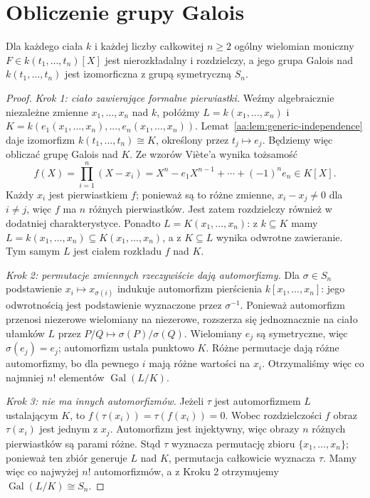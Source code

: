 \section{Obliczenie grupy Galois}
\begin{twierdzenie}
\label{aa:tw:generic-sn}
Dla każdego ciała $k$ i każdej liczby całkowitej $n\ge2$ ogólny
wielomian moniczny $F\in k(t_1,\ldots,t_n)[X]$ jest nierozkładalny
i rozdzielczy, a jego grupa Galois nad $k(t_1,\ldots,t_n)$
jest izomorficzna z grupą symetryczną $S_n$.
\end{twierdzenie}
\begin{proof}
\emph{Krok 1: ciało zawierające formalne pierwiastki.}
Weźmy algebraicznie niezależne zmienne $x_1,\ldots,x_n$ nad $k$,
połóżmy $L=k(x_1,\ldots,x_n)$ i
$K=k(e_1(x_1,\ldots,x_n),\ldots,e_n(x_1,\ldots,x_n))$.
Lemat~\ref{aa:lem:generic-independence} daje izomorfizm
$k(t_1,\ldots,t_n)\cong K$, określony przez $t_j\mapsto e_j$.
Będziemy więc obliczać grupę Galois nad $K$.
Ze wzorów Viète'a wynika tożsamość
\[
 f(X)=\prod_{i=1}^n(X-x_i)
 =X^n-e_1X^{n-1}+\cdots+(-1)^ne_n\in K[X].
\]
Każdy $x_i$ jest pierwiastkiem $f$; ponieważ są to różne zmienne,
$x_i-x_j\ne0$ dla $i\ne j$, więc $f$ ma $n$ różnych pierwiastków.
Jest zatem rozdzielczy również w dodatniej charakterystyce.
Ponadto $L=K(x_1,\ldots,x_n)$: z $k\subseteq K$ mamy
$L=k(x_1,\ldots,x_n)\subseteq K(x_1,\ldots,x_n)$,
a z $K\subseteq L$ wynika odwrotne zawieranie.
Tym samym $L$ jest ciałem rozkładu $f$ nad $K$.

\emph{Krok 2: permutacje zmiennych rzeczywiście dają automorfizmy.}
Dla $\sigma\in S_n$ podstawienie $x_i\mapsto x_{\sigma(i)}$
indukuje automorfizm pierścienia $k[x_1,\ldots,x_n]$:
jego odwrotnością jest podstawienie wyznaczone przez $\sigma^{-1}$.
Ponieważ automorfizm przenosi niezerowe wielomiany na niezerowe,
rozszerza się jednoznacznie na ciało ułamków $L$ przez
$P/Q\mapsto\sigma(P)/\sigma(Q)$.
Wielomiany $e_j$ są symetryczne, więc $\sigma(e_j)=e_j$;
automorfizm ustala punktowo $K$.
Różne permutacje dają różne automorfizmy, bo dla pewnego $i$
mają różne wartości na $x_i$. Otrzymaliśmy więc co najmniej
$n!$ elementów $\operatorname{Gal}(L/K)$.

\emph{Krok 3: nie ma innych automorfizmów.}
Jeżeli $\tau$ jest automorfizmem $L$ ustalającym $K$, to
$f(\tau(x_i))=\tau(f(x_i))=0$.
Wobec rozdzielczości $f$ obraz $\tau(x_i)$ jest jednym z $x_j$.
Automorfizm jest injektywny, więc obrazy $n$ różnych pierwiastków
są parami różne. Stąd $\tau$ wyznacza permutację zbioru
$\{x_1,\ldots,x_n\}$; ponieważ ten zbiór generuje $L$ nad $K$,
permutacja całkowicie wyznacza $\tau$. Mamy więc co najwyżej $n!$
automorfizmów, a z Kroku 2 otrzymujemy
$\operatorname{Gal}(L/K)\cong S_n$.


\end{proof}
